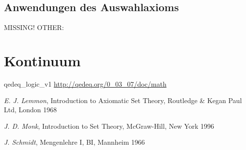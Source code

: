 \documentclass[a4paper,german,10pt,twoside]{book}
\theoremstyle{definition}
\theoremstyle{remark}
\begin{document}
\section{Anwendungen des Auswahlaxioms} \label{chapter6_section1} \hypertarget{chapter6_section1}{}
MISSING! OTHER: 



\chapter{Kontinuum} \label{chapter7} \hypertarget{chapter7}{}




\begin{thebibliography}{99}


 qedeq\_logic\_v1 \url{http://qedeq.org/0_03_07/doc/math}



 \emph{E. J. Lemmon}, Introduction to Axiomatic Set Theory, Routledge \& Kegan Paul Ltd, London 1968

 \emph{J. D. Monk}, Introduction to Set Theory, McGraw-Hill, New York 1996

 \emph{J. Schmidt}, Mengenlehre I, BI, Mannheim 1966

\end{thebibliography}
\backmatter

 \printindex
\end{document}
